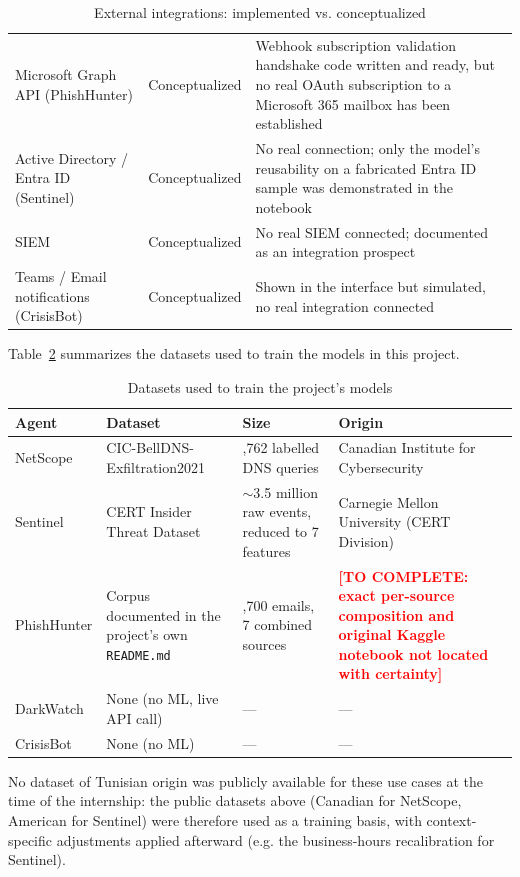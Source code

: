 \documentclass[12pt,a4paper]{report}
\newcommand{\TODO}[1]{\textcolor{red}{\textbf{[TO COMPLETE: #1]}}}
\begin{document}
\begin{table}[htbp]
\begin{tabularx}{\textwidth}{@{}>{\raggedright\arraybackslash}p{3.4cm}>{\raggedright\arraybackslash}p{2.8cm}>{\raggedright\arraybackslash}X@{}}
Microsoft Graph API (PhishHunter) & Conceptualized & Webhook subscription validation handshake code written and ready, but no real OAuth subscription to a Microsoft 365 mailbox has been established \\
Active Directory / Entra ID (Sentinel) & Conceptualized & No real connection; only the model's reusability on a fabricated Entra ID sample was demonstrated in the notebook \\
SIEM & Conceptualized & No real SIEM connected; documented as an integration prospect \\
Teams / Email notifications (CrisisBot) & Conceptualized & Shown in the interface but simulated, no real integration connected \\
\bottomrule
\end{tabularx}
\caption{External integrations: implemented vs. conceptualized}
\label{tab:integrations}
\end{table}

Table~\ref{tab:datasets} summarizes the datasets used to train the models in this project.

\begin{table}[htbp]
\centering
\begin{tabular}{@{}>{\raggedright\arraybackslash}p{2.6cm}>{\raggedright\arraybackslash}p{3.6cm}>{\raggedright\arraybackslash}p{3.5cm}>{\raggedright\arraybackslash}p{3cm}@{}}
\toprule
\textbf{Agent} & \textbf{Dataset} & \textbf{Size} & \textbf{Origin} \\
\midrule
NetScope & CIC-BellDNS-Exfiltration2021 & 102,762 labelled DNS queries & Canadian Institute for Cybersecurity \\
Sentinel & CERT Insider Threat Dataset & $\sim$3.5 million raw events, reduced to 7 features & Carnegie Mellon University (CERT Division) \\
PhishHunter & Corpus documented in the project's own \texttt{README.md} & 163,700 emails, 7 combined sources & \TODO{exact per-source composition and original Kaggle notebook not located with certainty} \\
DarkWatch & None (no ML, live API call) & --- & --- \\
CrisisBot & None (no ML) & --- & --- \\
\bottomrule
\end{tabular}
\caption{Datasets used to train the project's models}
\label{tab:datasets}
\end{table}

No dataset of Tunisian origin was publicly available for these use cases at the time of the internship: the public datasets above (Canadian for NetScope, American for Sentinel) were therefore used as a training basis, with context-specific adjustments applied afterward (e.g. the business-hours recalibration for Sentinel).
\end{document}
